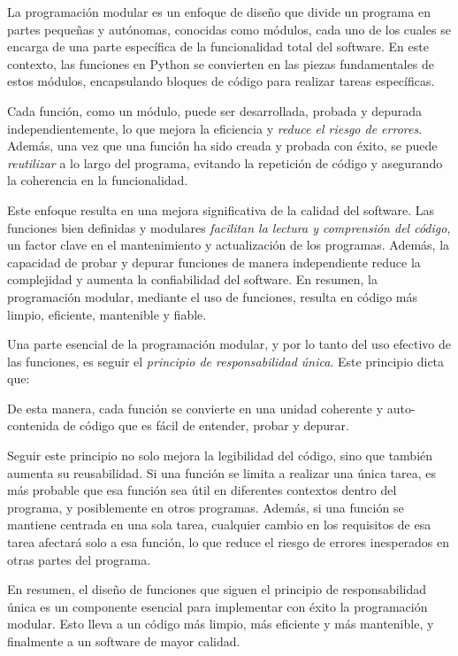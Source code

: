 La programación modular es un enfoque de diseño que divide un programa en partes pequeñas y autónomas, conocidas como módulos, cada uno de los cuales se encarga de una parte específica de la funcionalidad total del software. En este contexto, las funciones en Python se convierten en las piezas fundamentales de estos módulos, encapsulando bloques de código para realizar tareas específicas.

Cada función, como un módulo, puede ser desarrollada, probada y depurada independientemente, lo que mejora la eficiencia y \textit{reduce el riesgo de errores}. Además, una vez que una función ha sido creada y probada con éxito, se puede \textit{reutilizar} a lo largo del programa, evitando la repetición de código y asegurando la coherencia en la funcionalidad.

Este enfoque resulta en una mejora significativa de la calidad del software. Las funciones bien definidas y modulares \textit{facilitan la lectura y comprensión del código}, un factor clave en el mantenimiento y actualización de los programas. Además, la capacidad de probar y depurar funciones de manera independiente reduce la complejidad y aumenta la confiabilidad del software. En resumen, la programación modular, mediante el uso de funciones, resulta en código más limpio, eficiente, mantenible y fiable.

Una parte esencial de la programación modular, y por lo tanto del uso efectivo de las funciones, es seguir el \textit{principio de responsabilidad única}. Este principio dicta que:

\begin{center}
\end{center}

De esta manera, cada función se convierte en una unidad coherente y auto-contenida de código que es fácil de entender, probar y depurar.

Seguir este principio no solo mejora la legibilidad del código, sino que también aumenta su reusabilidad. Si una función se limita a realizar una única tarea, es más probable que esa función sea útil en diferentes contextos dentro del programa, y posiblemente en otros programas. Además, si una función se mantiene centrada en una sola tarea, cualquier cambio en los requisitos de esa tarea afectará solo a esa función, lo que reduce el riesgo de errores inesperados en otras partes del programa.

En resumen, el diseño de funciones que siguen el principio de responsabilidad única es un componente esencial para implementar con éxito la programación modular. Esto lleva a un código más limpio, más eficiente y más mantenible, y finalmente a un software de mayor calidad.


